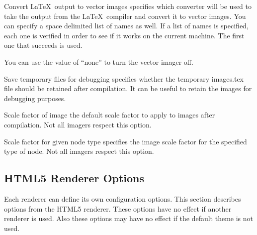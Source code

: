 \begin{configuration}{Convert \LaTeX\ output to vector images}
specifies which converter will be used to take the output from the
\LaTeX\ compiler and convert it to vector images.  You can specify a space
delimited list of names as well.  If a list of names is specified,
each one is verified in order to see if it works on the current machine.
The first one that succeeds is used.

You can use the value of ``none'' to turn the vector imager off.

\end{configuration}

\begin{configuration}{Save temporary files for debugging}
specifies whether the temporary images.tex file should be retained after
compilation. It can be useful to retain the images for debugging purposes.
\end{configuration}

\begin{configuration}{Scale factor of image}
the default scale factor to apply to images after compilation. Not all imagers respect
this option.
\end{configuration}

\begin{configuration}{Scale factor for given node type}
specifies the image scale factor for the specified type of node.
Not all imagers respect this option.
\end{configuration}

\subsection{HTML5 Renderer Options\label{sec:config-html5}}

Each renderer can define its own configuration options. This section
describes options from the HTML5 renderer. These options have no effect
if another renderer is used. Also these options may have no effect if
the default theme is not used.

